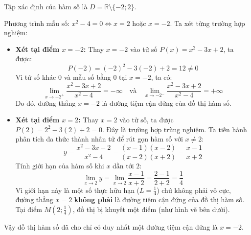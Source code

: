 \documentclass[12pt]{article}
\begin{document}
	\begin{loigiai}
		Tập xác định của hàm số là $D = \mathbb{R} \setminus \{-2; 2\}$.
		
		Phương trình mẫu số: $x^2 - 4 = 0 \Leftrightarrow x = 2$ hoặc $x = -2$. Ta xét từng trường hợp nghiệm:
		
		\begin{itemize}
			\item \textbf{Xét tại điểm $x = -2$:}
			Thay $x = -2$ vào tử số $P(x) = x^2 - 3x + 2$, ta được:
			\[ P(-2) = (-2)^2 - 3(-2) + 2 = 12 \ne 0 \]
			Vì tử số khác $0$ và mẫu số bằng $0$ tại $x = -2$, ta có:
			\[ \lim_{x \to -2^+} \frac{x^2 - 3x + 2}{x^2 - 4} = -\infty \quad \text{và} \quad \lim_{x \to -2^-} \frac{x^2 - 3x + 2}{x^2 - 4} = +\infty \]
			Do đó, đường thẳng $x = -2$ là đường tiệm cận đứng của đồ thị hàm số.
			
			\item \textbf{Xét tại điểm $x = 2$:}
			Thay $x = 2$ vào tử số, ta được $P(2) = 2^2 - 3(2) + 2 = 0$. Đây là trường hợp trùng nghiệm. Ta tiến hành phân tích đa thức thành nhân tử để rút gọn hàm số với $x \ne 2$:
			\[ y = \frac{x^2 - 3x + 2}{x^2 - 4} = \frac{(x - 1)(x - 2)}{(x - 2)(x + 2)} = \frac{x - 1}{x + 2} \]
			Tính giới hạn của hàm số khi $x$ dần tới $2$:
			\[ \lim_{x \to 2} y = \lim_{x \to 2} \frac{x - 1}{x + 2} = \frac{2 - 1}{2 + 2} = \frac{1}{4} \]
			Vì giới hạn này là một số thực hữu hạn ($L = \frac{1}{4}$) chứ không phải vô cực, đường thẳng $x = 2$ \textbf{không phải} là đường tiệm cận đứng của đồ thị hàm số. Tại điểm $M\left(2; \frac{1}{4}\right)$, đồ thị bị khuyết một điểm (như hình vẽ bên dưới).
		\end{itemize}
		Vậy đồ thị hàm số đã cho chỉ có duy nhất một đường tiệm cận đứng là $x = -2$.
		
		\begin{figure}[H]
			\centering
\end{figure}
\end{loigiai}
\end{document}
